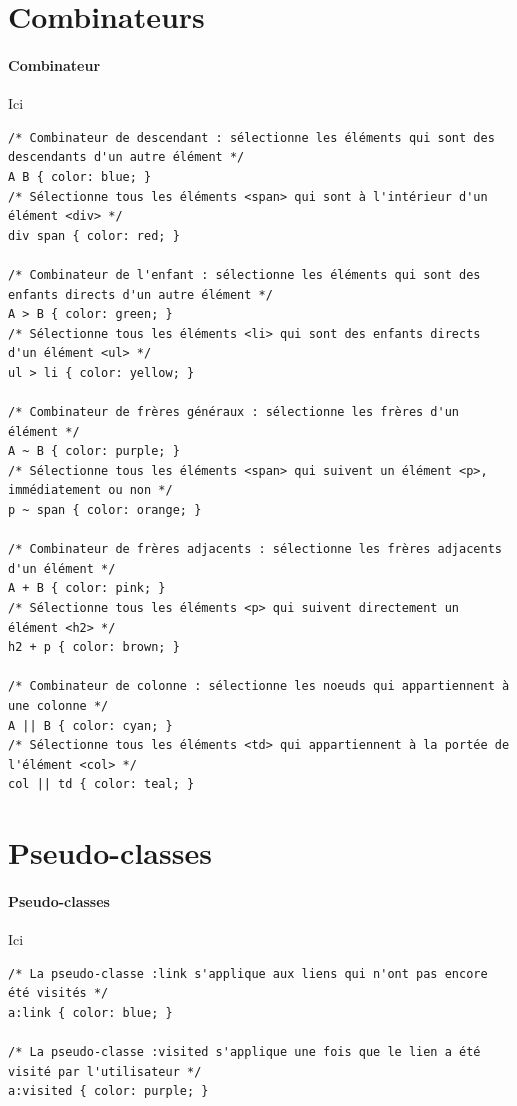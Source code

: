 \documentclass{report}
\begin{document}
\begin{multicols*}{2}
\section{Combinateurs}
\paragraph{Combinateur} Ici
\begin{lstlisting}[style=CSSDraculaLight]
/* Combinateur de descendant : sélectionne les éléments qui sont des descendants d'un autre élément */
A B { color: blue; }
/* Sélectionne tous les éléments <span> qui sont à l'intérieur d'un élément <div> */
div span { color: red; }

/* Combinateur de l'enfant : sélectionne les éléments qui sont des enfants directs d'un autre élément */
A > B { color: green; }
/* Sélectionne tous les éléments <li> qui sont des enfants directs d'un élément <ul> */
ul > li { color: yellow; }

/* Combinateur de frères généraux : sélectionne les frères d'un élément */
A ~ B { color: purple; }
/* Sélectionne tous les éléments <span> qui suivent un élément <p>, immédiatement ou non */
p ~ span { color: orange; }

/* Combinateur de frères adjacents : sélectionne les frères adjacents d'un élément */
A + B { color: pink; }
/* Sélectionne tous les éléments <p> qui suivent directement un élément <h2> */
h2 + p { color: brown; }

/* Combinateur de colonne : sélectionne les noeuds qui appartiennent à une colonne */
A || B { color: cyan; }
/* Sélectionne tous les éléments <td> qui appartiennent à la portée de l'élément <col> */
col || td { color: teal; }
\end{lstlisting}

\section{Pseudo-classes}
\paragraph{Pseudo-classes} Ici

\begin{lstlisting}[style=CSSDraculaLight]
/* La pseudo-classe :link s'applique aux liens qui n'ont pas encore été visités */
a:link { color: blue; }

/* La pseudo-classe :visited s'applique une fois que le lien a été visité par l'utilisateur */
a:visited { color: purple; }


\end{lstlisting}
\end{multicols*}
\end{document}
